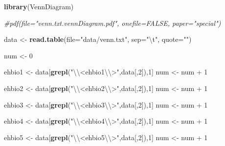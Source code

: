 \documentclass[]{article}
\newenvironment{Shaded}{\begin{snugshade}}{\end{snugshade}}
\newcommand{\KeywordTok}[1]{\textcolor[rgb]{0.13,0.29,0.53}{\textbf{{#1}}}}
\newcommand{\DataTypeTok}[1]{\textcolor[rgb]{0.13,0.29,0.53}{{#1}}}
\newcommand{\DecValTok}[1]{\textcolor[rgb]{0.00,0.00,0.81}{{#1}}}
\newcommand{\CharTok}[1]{\textcolor[rgb]{0.31,0.60,0.02}{{#1}}}
\newcommand{\StringTok}[1]{\textcolor[rgb]{0.31,0.60,0.02}{{#1}}}
\newcommand{\CommentTok}[1]{\textcolor[rgb]{0.56,0.35,0.01}{\textit{{#1}}}}
\newcommand{\NormalTok}[1]{{#1}}
\numberwithin{figure}{section}
\numberwithin{table}{section}
\theoremstyle{definition}
\theoremstyle{definition}
\theoremstyle{definition}
\theoremstyle{remark}
\begin{document}
\begin{Shaded}
\begin{Highlighting}[]
\KeywordTok{library}\NormalTok{(VennDiagram)}

\CommentTok{#pdf(file="venn.txt.vennDiagram.pdf", onefile=FALSE, paper="special")}

\NormalTok{data <-}\StringTok{ }\KeywordTok{read.table}\NormalTok{(}\DataTypeTok{file=}\StringTok{"data/venn.txt"}\NormalTok{, }\DataTypeTok{sep=}\StringTok{"}\CharTok{\textbackslash{}t}\StringTok{"}\NormalTok{, }\DataTypeTok{quote=}\StringTok{""}\NormalTok{)}

\NormalTok{num <-}\StringTok{ }\DecValTok{0}

\NormalTok{ehbio1 <-}\StringTok{ }\NormalTok{data[}\KeywordTok{grepl}\NormalTok{(}\StringTok{"}\CharTok{\textbackslash{}\textbackslash{}}\StringTok{<ehbio1}\CharTok{\textbackslash{}\textbackslash{}}\StringTok{>"}\NormalTok{,data[,}\DecValTok{2}\NormalTok{]),}\DecValTok{1}\NormalTok{]}
\NormalTok{num <-}\StringTok{ }\NormalTok{num +}\StringTok{ }\DecValTok{1}

\NormalTok{ehbio2 <-}\StringTok{ }\NormalTok{data[}\KeywordTok{grepl}\NormalTok{(}\StringTok{"}\CharTok{\textbackslash{}\textbackslash{}}\StringTok{<ehbio2}\CharTok{\textbackslash{}\textbackslash{}}\StringTok{>"}\NormalTok{,data[,}\DecValTok{2}\NormalTok{]),}\DecValTok{1}\NormalTok{]}
\NormalTok{num <-}\StringTok{ }\NormalTok{num +}\StringTok{ }\DecValTok{1}

\NormalTok{ehbio3 <-}\StringTok{ }\NormalTok{data[}\KeywordTok{grepl}\NormalTok{(}\StringTok{"}\CharTok{\textbackslash{}\textbackslash{}}\StringTok{<ehbio3}\CharTok{\textbackslash{}\textbackslash{}}\StringTok{>"}\NormalTok{,data[,}\DecValTok{2}\NormalTok{]),}\DecValTok{1}\NormalTok{]}
\NormalTok{num <-}\StringTok{ }\NormalTok{num +}\StringTok{ }\DecValTok{1}

\NormalTok{ehbio4 <-}\StringTok{ }\NormalTok{data[}\KeywordTok{grepl}\NormalTok{(}\StringTok{"}\CharTok{\textbackslash{}\textbackslash{}}\StringTok{<ehbio4}\CharTok{\textbackslash{}\textbackslash{}}\StringTok{>"}\NormalTok{,data[,}\DecValTok{2}\NormalTok{]),}\DecValTok{1}\NormalTok{]}
\NormalTok{num <-}\StringTok{ }\NormalTok{num +}\StringTok{ }\DecValTok{1}

\NormalTok{ehbio5 <-}\StringTok{ }\NormalTok{data[}\KeywordTok{grepl}\NormalTok{(}\StringTok{"}\CharTok{\textbackslash{}\textbackslash{}}\StringTok{<ehbio5}\CharTok{\textbackslash{}\textbackslash{}}\StringTok{>"}\NormalTok{,data[,}\DecValTok{2}\NormalTok{]),}\DecValTok{1}\NormalTok{]}
\NormalTok{num <-}\StringTok{ }\NormalTok{num +}\StringTok{ }\DecValTok{1}


\end{Highlighting}
\end{Shaded}
\end{document}
